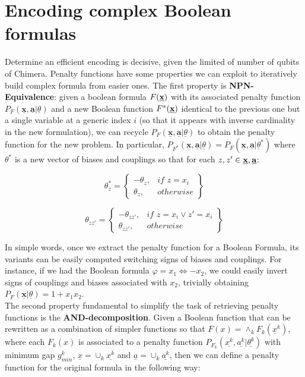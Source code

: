 \section{Encoding complex Boolean formulas}

Determine an efficient encoding is decisive, given the limited of number of qubits of Chimera. Penalty functions have some properties we can exploit to iteratively build complex formula from easier ones. The first property is \textbf{NPN-Equivalence}: given a boolean formula $F(\textbf{\underline{x}})$ with its associated penalty function $P_F(\underline{\textbf{x}},\underline{\textbf{a}} | \underline{\theta})$ and a new Boolean function $F^*(\textbf{\underline{x}})$ identical to the previous one but a single variable at a generic index $i$ (so that it appears with inverse cardinality in the new formulation), we can recycle $P_F(\underline{\textbf{x}},\underline{\textbf{a}} | \underline{\theta})$ to obtain the penalty function for the new problem. In particular, $P_{F^*}(\underline{\textbf{x}},\underline{\textbf{a}} | \underline{\theta}) = P_F(\underline{\textbf{x}},\underline{\textbf{a}} | \underline{\theta}^*)$ where $\theta^*$ is a new vector of biases and couplings so that for each $z,z'\in \textbf{\underline{x}},\textbf{\underline{a}}$:

\begin{equation}
    \theta_z^* = 
    \left\{
        \begin{array}{lr}
            -\theta_z, & \textit{if }z = x_i \\
            \theta_z, & otherwise
        \end{array}
    \right\}
\end{equation}

\begin{equation}
    \theta_{zz'} = 
    \left\{
        \begin{array}{lr}
            -\theta_{zz'}, & \textit{if }z = x_i \vee z' = x_i\\
            \theta_{zz'}, & otherwise
        \end{array}
    \right\}
\end{equation}


In simple words, once we extract the penalty function for a Boolean Formula, its variants can be easily computed switching signs of biases and couplings. For instance, if we had the Boolean formula $\varphi = x_1 \iff -x_2$, we could easily invert signs of couplings and biases associated with $x_2$, trivially obtaining $P_F(\underline{\textbf{x}} | \underline{\theta}) = 1 + x_1x_2$. \\
The second property fundamental to simplify the task of retrieving penalty functions is the \textbf{AND-decomposition}. Given a Boolean function that can be rewritten as a combination of simpler functions so that $F(x) = \land_k F_k(\underline{x}^k)$, where each $F_k(x)$ is associated to a penalty function $P_{F_k}(\underline{x^k},\underline{a^k}|\underline{\theta^k})$ with minimum gap $g^k_{min}$, $\underline{x} = \cup_k \underline{x^k}$ and $\underline{a} = \cup_k \underline{a^k}$, then we can define a penalty function for the original formula in the following way:

